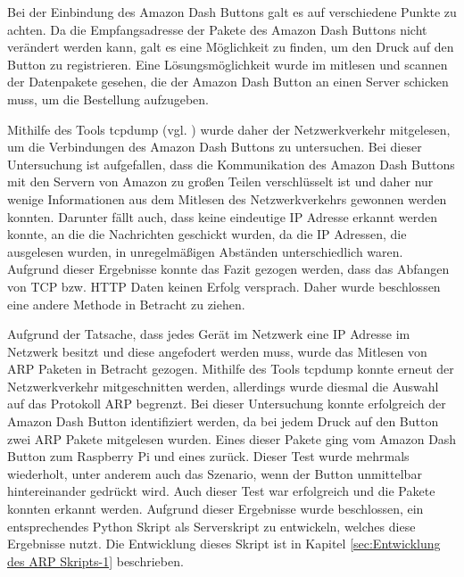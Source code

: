 Bei der Einbindung des Amazon Dash Buttons galt es auf verschiedene Punkte zu achten. 
Da die Empfangsadresse der Pakete des Amazon Dash Buttons nicht verändert werden kann, galt es eine Möglichkeit zu finden, um den Druck auf den Button zu registrieren.
Eine Lösungsmöglichkeit wurde im mitlesen und scannen der Datenpakete gesehen, die der Amazon Dash Button an einen Server schicken muss, um die Bestellung aufzugeben.

Mithilfe des Tools tcpdump (vgl. \cite{.tcpdump}) wurde daher der Netzwerkverkehr mitgelesen, um die Verbindungen des Amazon Dash Buttons zu untersuchen. 
Bei dieser Untersuchung ist aufgefallen, dass die Kommunikation des Amazon Dash Buttons mit den Servern von Amazon zu großen Teilen verschlüsselt ist und daher nur wenige Informationen aus dem Mitlesen des Netzwerkverkehrs gewonnen werden konnten. 
Darunter fällt auch, dass keine eindeutige \ac{IP} Adresse erkannt werden konnte, an die die Nachrichten geschickt wurden, da die \ac{IP} Adressen, die ausgelesen wurden, in unregelmäßigen Abständen unterschiedlich waren.
Aufgrund dieser Ergebnisse konnte das Fazit gezogen werden, dass das Abfangen von \ac{TCP} bzw. \ac{HTTP} Daten keinen Erfolg versprach.
Daher wurde beschlossen eine andere Methode in Betracht zu ziehen.

Aufgrund der Tatsache, dass jedes Gerät im Netzwerk eine \ac{IP} Adresse im Netzwerk besitzt und diese angefodert werden muss, wurde das Mitlesen von \ac{ARP} Paketen in Betracht gezogen.
Mithilfe des Tools tcpdump konnte erneut der Netzwerkverkehr mitgeschnitten werden, allerdings wurde diesmal die Auswahl auf das Protokoll \ac{ARP} begrenzt. 
Bei dieser Untersuchung konnte erfolgreich der Amazon Dash Button identifiziert werden, da bei jedem Druck auf den Button zwei \ac{ARP} Pakete mitgelesen wurden.
Eines dieser Pakete ging vom Amazon Dash Button zum Raspberry Pi und eines zurück. 
Dieser Test wurde mehrmals wiederholt, unter anderem auch das Szenario, wenn der Button unmittelbar hintereinander gedrückt wird. 
Auch dieser Test war erfolgreich und die Pakete konnten erkannt werden.
Aufgrund dieser Ergebnisse wurde beschlossen, ein entsprechendes Python Skript als Serverskript zu entwickeln, welches diese Ergebnisse nutzt.
Die Entwicklung dieses Skript ist in Kapitel \ref{sec:Entwicklung des ARP Skripts-1} beschrieben. 